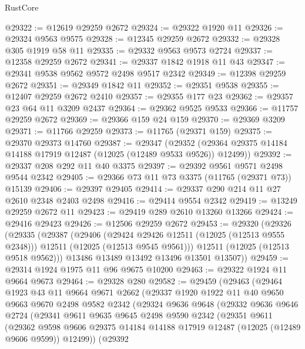 \begin{lexlean}{RustCore}
\begin{coremodule}
@29322 := @12619 @29259 @2672
@29324 := @29322 @1920 @11
@29326 := @29324 @9563 @9575
@29328 := @12345 @29259 @2672
@29332 := @29328 @305 @1919 @58 @11
@29335 := @29332 @9563 @9573 @2724
@29337 := @12358 @29259 @2672
@29341 := @29337 @1842 @1918 @11 @43
@29347 := @29341 @9538 @9562 @9572 @2498 @9517 @2342
@29349 := @12398 @29259 @2672
@29351 := @29349 @1842 @11
@29352 := @29351 @9538
@29355 := @12407 @29259 @2672 @2410
@29357 := @29355 @177 @23
@29362 := @29357 @23 @64 @11 @3209 @2437
@29364 := @29362 @9525 @9533
@29366 := @11757 @29259 @2672
@29369 := @29366 @159 @24 @159
@29370 := @29369 @3209
@29371 := @11766 @29259
@29373 := @11765 (@29371 @159)
@29375 := @29370 @29373 @14760
@29387 := @29347
    (@29352 (@29364 @29375 @14184 @14188 @17919 @12487 (@12025 (@12489 @9533 @9526)) @12499))
@29392 := @29337 @208 @292 @11 @40 @3375
@29397 := @29392 @9561 @9571 @2498 @9544 @2342
@29405 := @29366 @73 @11 @73 @3375 (@11765 (@29371 @73)) @15139
@29406 := @29397 @29405
@29414 := @29337 @290 @214 @11 @27 @2610 @2348 @2403 @2498
@29416 := @29414 @9554 @2342
@29419 := @13249 @29259 @2672 @11
@29423 := @29419 @289 @2610 @13260 @13266
@29424 := @29416 @29423
@29426 := @12506 @29259 @2672
@29453 := @29320
    (@29326
      (@29335
        (@29387
          (@29406
            (@29424 @29426 @12511 (@12025 (@12513 @9555 @2348)))
            @12511
            (@12025 (@12513 @9545 @9561)))
          @12511
          (@12025 (@12513 @9518 @9562)))
        @13486
        @13489
        @13492
        @13496
        @13501
        @13507))
@29459 := @29314 @1924 @1975 @11 @96 @9675 @10200
@29463 := @29322 @1924 @11 @9664 @9673
@29464 := @29328 @280
@29582 := @29459
    (@29463
      (@29464
        @1923
        @43
        @11
        @9664
        @9671
        @2662
        (@29337
          @1920
          @1922
          @11
          @40
          @9650
          @9663
          @9670
          @2498
          @9582
          @2342
          (@29324
            @9636
            @9648
            (@29332
              @9636
              @9646
              @2724
              (@29341
                @9611
                @9635
                @9645
                @2498
                @9590
                @2342
                (@29351
                  @9611
                  (@29362
                    @9598
                    @9606
                    @29375
                    @14184
                    @14188
                    @17919
                    @12487
                    (@12025 (@12489 @9606 @9599))
                    @12499))
                (@29392

\end{coremodule}
\end{lexlean}
